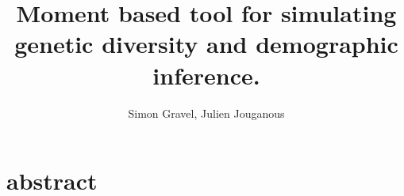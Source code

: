 \documentclass[11pt,a4paper]{article}
\title{\bf Moment based tool for simulating genetic diversity and demographic inference.}
\author{Simon Gravel, Julien Jouganous}
\begin{document}
\maketitle

\section*{abstract}










\nocite{*}



\end{document}
